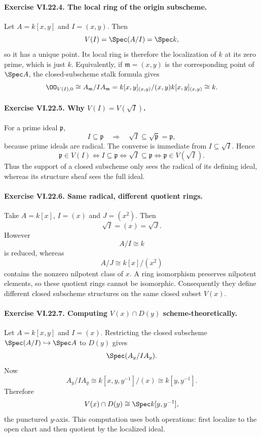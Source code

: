 \paragraph{Exercise VI.22.4. The local ring of the origin subscheme.}
\begin{solution}
Let $A=k[x,y]$ and $I=(x,y)$.  Then
\[
 V(I)=\Spec(A/I)=\Spec k,
\]
so it has a unique point.  Its local ring is therefore the localization of $k$ at its zero
prime, which is just $k$.  Equivalently, if $\mathfrak m=(x,y)$ is the corresponding point
of $\Spec A$, the closed-subscheme stalk formula gives
\[
 \OO_{V(I),0}
 \cong A_{\mathfrak m}/IA_{\mathfrak m}
 =k[x,y]_{(x,y)}/(x,y)k[x,y]_{(x,y)}
 \cong k.
\]
\end{solution}

\paragraph{Exercise VI.22.5. Why $V(I)=V(\sqrt I)$.}
\begin{solution}
For a prime ideal $\mathfrak p$,
\[
 I\subseteq\mathfrak p\quad\Longrightarrow\quad \sqrt I\subseteq\sqrt{\mathfrak p}
 =\mathfrak p,
\]
because prime ideals are radical.  The converse is immediate from $I\subseteq\sqrt I$.
Hence
\[
 \mathfrak p\in V(I)
 \iff I\subseteq\mathfrak p
 \iff \sqrt I\subseteq\mathfrak p
 \iff \mathfrak p\in V(\sqrt I).
\]
Thus the support of a closed subscheme only sees the radical of its defining ideal, whereas
its structure sheaf sees the full ideal.
\end{solution}

\paragraph{Exercise VI.22.6. Same radical, different quotient rings.}
\begin{solution}
Take $A=k[x]$, $I=(x)$ and $J=(x^2)$.  Then
\[
 \sqrt I=(x)=\sqrt J.
\]
However
\[
 A/I\cong k
\]
is reduced, whereas
\[
 A/J\cong k[x]/(x^2)
\]
contains the nonzero nilpotent class of $x$.  A ring isomorphism preserves nilpotent
elements, so these quotient rings cannot be isomorphic.  Consequently they define different
closed subscheme structures on the same closed subset $V(x)$.
\end{solution}

\paragraph{Exercise VI.22.7. Computing $V(x)\cap D(y)$ scheme-theoretically.}
\begin{solution}
Let $A=k[x,y]$ and $I=(x)$.  Restricting the closed subscheme
$\Spec(A/I)\hookrightarrow\Spec A$ to $D(y)$ gives
\[
 \Spec(A_y/IA_y).
\]
Now
\[
 A_y/IA_y
 \cong k[x,y,y^{-1}]/(x)
 \cong k[y,y^{-1}].
\]
Therefore
\[
 V(x)\cap D(y)\cong\Spec k[y,y^{-1}],
\]
the punctured $y$-axis.  This computation uses both operations: first localize to the open
chart and then quotient by the localized ideal.
\end{solution}

